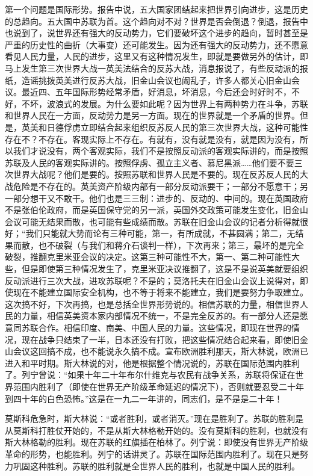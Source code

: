 第一个问题是国际形势。报告中说，五大国家团结起来把世界引向进步，这是历史的总趋向。五大国中苏联为首。这个趋向对不对？世界是否会倒退？倒退，报告中也说到了，说世界还有强大的反动势力，它们要破坏这个进步的趋向，暂时甚至是严重的历史性的曲折（大事变）还可能发生。因为还有强大的反动势力，还不愿意看见人民力量，人民的进步，这里又有这种情况发生，即就是要做另外的估计，即马上发生第三次世界大战一英美法结合的反苏大战，消息报说了，有些反动派的报纸，造谣挑拨英美进行反苏大战，旧金山会议也闹乱子，许多人都关心旧金山会议。最近四、五年国际形势经常矛盾，好消息，坏消息，今后还会时好时不，不好，不坏，波浪式的发展。为什么要如此呢？因为世界上有两种势力在斗争，苏联和世界人民在一方面，反动势力是另一方面。现在的世界就是一个矛盾的世界。但是，英美和日德俘虏立即结合起来组织反苏反人民的第三次世界大战，这种可能性存在不？不存在。客现实际上不存在。有就有，没有就是没有，就是因为没有，所以我们才说没有，两个客观实际，我们不是按照反动派的客观实际讲的，而是按照苏联及人民的客观实际讲的。按照俘虏、孤立主义者、慕尼黑派……他们要不要三次世界大战呢？他们是要的。按照苏联和世界人民是不要的。现在反苏反人民的大战危险是不存在的。英美资产阶级内部有一部分反动派要干；一部分不愿意干；另一部分想干又不敢干。他们也是三三制：进步的、反动的、中间的。现在英国政府不是张伯伦政府，而是英国保守党的另一派，英国外交政策可能发生变化，旧金山会议可能无结果而散，也可能有些成绩而散。苏联在旧金山会议的记者分析得就很好；“我们只能就大势而论有三种可能，第一，有所成就，不甚圆满；第二，无结果而散，也不破裂（与我们和蒋介石谈判一样），下次再来；第三，最坏的是完全破裂，推翻克里米亚会议的决定。这第三种可能性不大，第一、第二种可能性大些，但是即使第三种情况发生了，克里米亚决议推翻了，这是不是说英美就要组织反动派进行三次大战，进攻苏联呢？不是的；莫洛托夫在旧金山会议上说得对，即使现在不能建立国际安全机构，也不等于将来不能建立，我们是要努力争取建立。这次搞不好，下次再搞，也是总括全世界形势说的。相信苏联的力量，相信世界人民的力量，相信英美资本家内部情况不统一，不是完全反苏的。有一部分人还是愿意同苏联合作。相信印度、南美、中国人民的力量。这些情况，即现在世界的情况，现在战争只结束了一半，日本还没有打败，把这些情况结合起来看，即使旧金山会议这回搞不成，也不能说永久搞不成。宣布欧洲胜利那天，斯大林说，欧洲已进入和平时期。斯大林说的对，他是根据整个情况说的，苏联在国际范围内胜利了。列宁曾说：“如果十年二十年布尔什维克与农民有战争关系，苏联将保证在世界范围内胜利了（即使在世界无产阶级革命延迟的情况下），否则就要忍受二十年到四十年的白色恐怖。”这是在一九二一年讲的，同志们，是不是是二十年！

莫斯科危急时，斯大林说：“或者胜利，或者消灭。”现在是胜利了。苏联的胜利是从莫斯科打胜仗开始的，不是从斯大林格勒开始的。没有莫斯科的胜利，也就没有斯大林格勒的胜利。现在苏联的红旗插在柏林了。列宁说：即使没有世界无产阶级革命的形势，也能胜利。列宁的话讲灵了。苏联在国际范围内胜利了。现在只是努力巩固这种胜利。苏联的胜利就是全世界人民的胜利，也就是中国人民的胜利。

